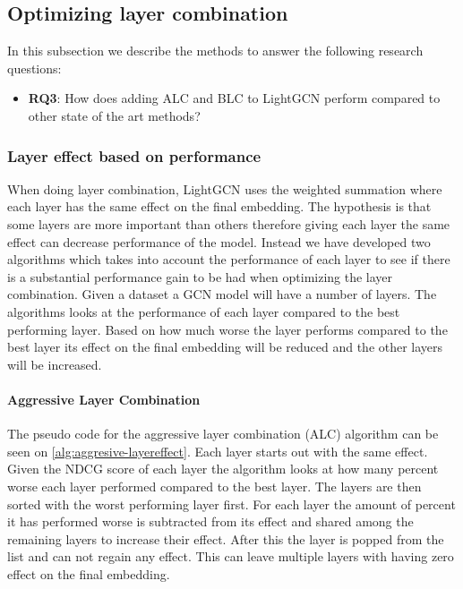\subsection{Optimizing layer combination}

In this subsection we describe the methods to answer the following research questions:
\begin{itemize}
    \item \textbf{RQ3}: How does adding ALC and BLC to LightGCN perform compared to other state of the art methods?
\end{itemize}  

\subsubsection{Layer effect based on performance} \label{fredsplit}
When doing layer combination, LightGCN uses the weighted summation where each layer has the same effect on the final embedding.
The hypothesis is that some layers are more important than others therefore giving each layer the same effect can decrease performance of the model.
Instead we have developed two algorithms which takes into account the performance of each layer to see if there is a substantial performance gain to be had when optimizing the layer combination.
Given a dataset a GCN model will have a number of layers.
The algorithms looks at the performance of each layer compared to the best performing layer.
Based on how much worse the layer performs compared to the best layer its effect on the final embedding will be reduced and the other layers will be increased.

\paragraph{Aggressive Layer Combination}
The pseudo code for the aggressive layer combination (ALC) algorithm can be seen on \autoref{alg:aggresive-layereffect}.
Each layer starts out with the same effect.
Given the NDCG score of each layer the algorithm looks at how many percent worse each layer performed compared to the best layer.
The layers are then sorted with the worst performing layer first.
For each layer the amount of percent it has performed worse is subtracted from its effect and shared among the remaining layers to increase their effect.
After this the layer is popped from the list and can not regain any effect.
This can leave multiple layers with having zero effect on the final embedding.

